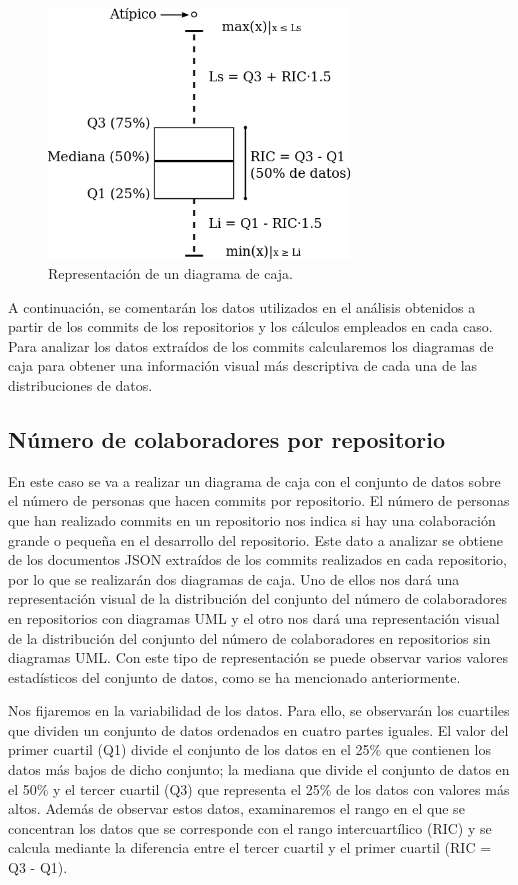 \documentclass[a4paper, 12pt]{book}
\begin{document}
\begin{figure}
  \centering
  \includegraphics[width=8cm, keepaspectratio]{img/Boxplot.png}
  \caption{Representación de un diagrama de caja.}\label{fig:boxplot}
\end{figure}

A continuación, se comentarán los datos utilizados en el análisis obtenidos a partir de los commits de los repositorios y los cálculos empleados en cada caso.
Para analizar los datos extraídos de los commits calcularemos los diagramas de caja para obtener una información visual más descriptiva de cada una de las distribuciones de datos.


\subsection{Número de colaboradores por repositorio} %
\label{sec:número de colaboradores por repositorio}

En este caso se va a realizar un diagrama de caja con el conjunto de datos sobre el número de personas que hacen commits por repositorio.
El número de personas que han realizado commits en un repositorio nos indica si hay una colaboración grande o pequeña en el desarrollo del repositorio.
Este dato a analizar se obtiene de los documentos JSON extraídos de los commits realizados en cada repositorio, por lo que se realizarán dos diagramas de caja.
Uno de ellos nos dará una representación visual de la distribución del conjunto del número de colaboradores en repositorios con diagramas UML y el otro nos dará una representación visual de la distribución del conjunto del número de colaboradores en repositorios sin diagramas UML.
Con este tipo de representación se puede observar varios valores estadísticos del conjunto de datos, como se ha mencionado anteriormente.


Nos fijaremos en la variabilidad de los datos. Para ello, se observarán los cuartiles que dividen un conjunto de datos ordenados en cuatro partes iguales.
El valor del primer cuartil (Q1) divide el conjunto de los datos en el 25\% que contienen los datos más bajos de dicho conjunto; la mediana que divide el conjunto de datos en el 50\% y el tercer cuartil (Q3) que representa el 25\% de los datos con valores más altos.
Además de observar estos datos, examinaremos el rango en el que se concentran los datos que se corresponde con el rango intercuartílico (RIC) y se calcula mediante la diferencia entre el tercer cuartil y el primer cuartil (RIC = Q3 - Q1).
\end{document}

